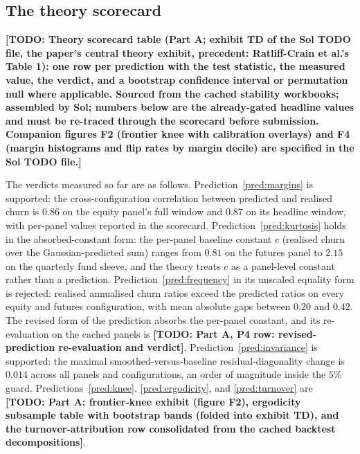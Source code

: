 \documentclass[11pt]{article}
\theoremstyle{remark}
\newcommand{\TODO}[1]{\textbf{[TODO: #1]}}
\begin{document}
\subsection{The theory scorecard}
\label{sec:scorecard}

\TODO{Theory scorecard table (Part A; exhibit TD of the Sol TODO file, the
paper's central theory exhibit, precedent: Ratliff-Crain et al.'s Table 1):
one row per prediction with the test statistic, the measured value, the
verdict, and a bootstrap confidence interval or permutation null where
applicable. Sourced from the cached stability workbooks; assembled by Sol;
numbers below are the already-gated headline values and must be re-traced
through the scorecard before submission. Companion figures F2 (frontier knee
with calibration overlays) and F4 (margin histograms and flip rates by margin
decile) are specified in the Sol TODO file.}

The verdicts measured so far are as follows. Prediction~\ref{pred:margins} is
supported: the cross-configuration correlation between predicted and realised
churn is $0.86$ on the equity panel's full window and $0.87$ on its headline
window, with per-panel values reported in the scorecard.
Prediction~\ref{pred:kurtosis} holds in the absorbed-constant form: the
per-panel baseline constant $c$ (realised churn over the Gaussian-predicted
sum) ranges from $0.81$ on the futures panel to $2.15$ on the quarterly fund
sleeve, and the theory treats $c$ as a panel-level constant rather than a
prediction.
Prediction~\ref{pred:frequency} in its unscaled equality form is rejected:
realised annualised churn ratios exceed the predicted ratios on every equity
and futures configuration, with mean absolute gaps between $0.20$ and $0.42$.
The revised form of the prediction absorbs the per-panel constant, and its
re-evaluation on the cached panels is \TODO{Part A, P4 row: revised-prediction
re-evaluation and verdict}. Prediction~\ref{pred:invariance} is supported: the
maximal smoothed-versus-baseline residual-diagonality change is $0.014$ across
all panels and configurations, an order of magnitude inside the $5\%$ guard.
Predictions~\ref{pred:knee}, \ref{pred:ergodicity}, and \ref{pred:turnover}
are \TODO{Part A: frontier-knee exhibit (figure F2), ergodicity subsample
table with bootstrap bands (folded into exhibit TD), and the
turnover-attribution row consolidated from the cached backtest
decompositions}.
\end{document}
